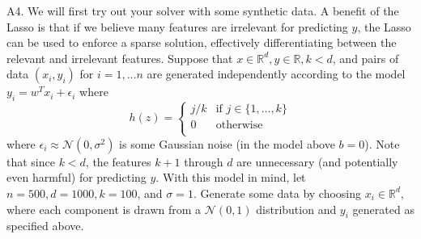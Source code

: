 \documentclass{article}
\newcommand{\field}[1]{\mathbb{#1}}
\newcommand{\1}{\mathbf{1}}
\newcommand{\N}{\mathcal{N}} %
\newcommand{\R}{\field{R}} %
\begin{document}
A4. We will first try out your solver with some synthetic data. A benefit of the Lasso is that if we believe many features are irrelevant for predicting $y$, the Lasso can be used to enforce a sparse solution, effectively differentiating between the relevant and irrelevant features. Suppose that $x\in\R^d, y\in\R,k < d$, and pairs of data $(x_i,y_i)$ for $i= 1,\hdots n$ are generated independently according to the model $y_i= w^Tx_i +\epsilon_i$ where
$$h(z) = \begin{cases} 
    j/k &\mbox{if } j \in \{1, \hdots ,k\} \\
    0 &\mbox{otherwise }  \\
\end{cases} 
$$ 
where $\epsilon_i \approx \N(0,\sigma^2)$ is some Gaussian noise (in the model above $b=0$). Note that since $k < d$, the features $k+1$ through $d$ are unnecessary (and potentially even harmful) for predicting $y$. With this model in mind, let $n= 500,d= 1000,k= 100$, and $\sigma=1$. Generate some data by choosing $x_i\in\R^d$, where each component is drawn from a $\N(0,1)$ distribution and $y_i$ generated as specified above. 
\end{document}
